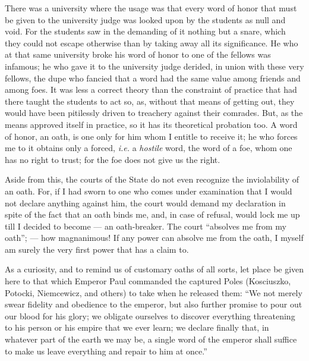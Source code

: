 There was a university where the usage was that every word of honor that must 
be given to the university judge was looked upon by the students as null and 
void. For the students saw in the demanding of it nothing but a snare, which 
they could not escape otherwise than by taking away all its significance. He 
who at that same university broke his word of honor to one of the fellows was 
infamous; he who gave it to the university judge derided, in union with these 
very fellows, the dupe who fancied that a word had the same value among 
friends and among foes. It was less a correct theory than the constraint of 
practice that had there taught the students to act so, as, without that means 
of getting out, they would have been pitilessly driven to treachery against 
their comrades. But, as the means approved itself in practice, so it has its 
theoretical probation too. A word of honor, an oath, is one only for him whom 
I entitle to receive it; he who forces me to it obtains only a forced, 
\textit{i.e.} a \textit{hostile} word, the word of a foe, whom one has no 
right to trust; for the foe does not give us the right.

Aside from this, the courts of the State do not even recognize the 
inviolability of an oath. For, if I had sworn to one who comes under 
examination that I would not declare anything against him, the court would 
demand my declaration in spite of the fact that an oath binds me, and, in case 
of refusal, would lock me up till I decided to become --- an oath-breaker. The 
court ``absolves me from my oath''; --- how magnanimous! If any power can 
absolve me from the oath, I myself am surely the very first power that has a 
claim to.

As a curiosity, and to remind us of customary oaths of all sorts, let place be 
given here to that which Emperor Paul commanded the captured Poles 
(Kosciuszko, Potocki, Niemcewicz, and others) to take when he released them: 
``We not merely swear fidelity and obedience to the emperor, but also further 
promise to pour out our blood for his glory; we obligate ourselves to discover 
everything threatening to his person or his empire that we ever learn; we 
declare finally that, in whatever part of the earth we may be, a single word 
of the emperor shall suffice to make us leave everything and repair to him at 
once.''

\myhrule

